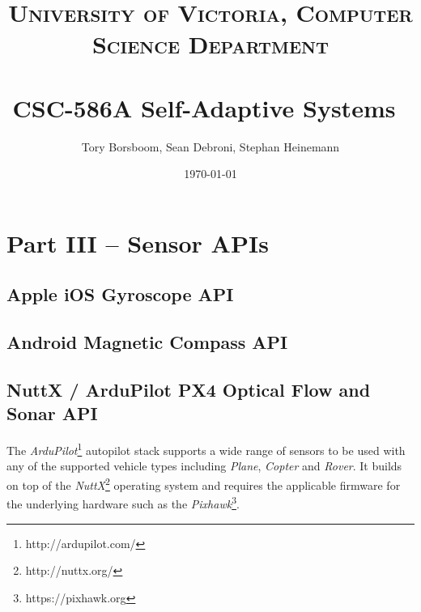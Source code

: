 \documentclass[paper=letter, fontsize=11pt]{scrartcl}
\title{	
\normalfont \normalsize 
\textsc{University of Victoria, Computer Science Department} \\ [25pt]
\horrule{0.5pt} \\[0.4cm]
\huge CSC-586A Self-Adaptive Systems\
\horrule{2pt} \\[0.5cm]
}
\author{Tory Borsboom, Sean Debroni, Stephan Heinemann}
\date{\normalsize\today}
\numberwithin{equation}{section}
\numberwithin{figure}{section}
\numberwithin{table}{section}
\begin{document}
\maketitle 

\section{Part III -- Sensor APIs}
\label{part3}

\subsection{Apple iOS Gyroscope API}
\label{ios_gyroscope_api}
\par

\subsection{Android Magnetic Compass API}
\label{androis_compass_api}

\subsection{NuttX / ArduPilot PX4 Optical Flow and Sonar API}
\label{ardupilot_flow_api}
\par
The {\em ArduPilot}\footnote{http://ardupilot.com/} autopilot stack supports a
wide range of sensors to be used with any of the supported vehicle types
including {\em Plane}, {\em Copter} and {\em Rover}. It builds on top of the
{\em NuttX}\footnote{http://nuttx.org/} operating system and requires the
applicable firmware for the underlying hardware such as the
{\em Pixhawk}\footnote{https://pixhawk.org}.
\end{document}
